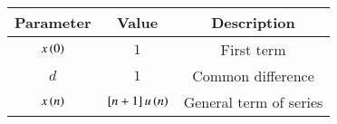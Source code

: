\begin{tabular}{|c|c|c|}
\hline
Parameter & Value & Description \\
\hline
$x\left(0\right)$ & $1$ & First term\\
\hline
$d$ & $1$ & Common difference\\
\hline
$x\left(n\right)$ & ${}\left[n+1\right]u\left(n\right)$ & General  term of series \\
\hline
\end{tabular}
